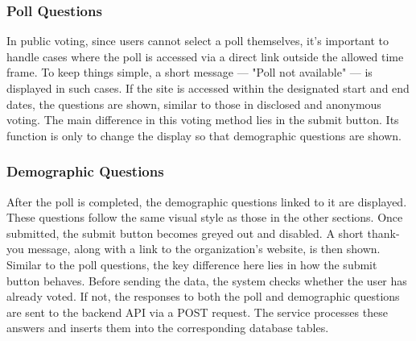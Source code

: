 \documentclass[a4paper,12pt]{report}
\begin{document}
\subsubsection{Poll Questions}
In public voting, since users cannot select a poll themselves, it's important to handle cases where the poll is accessed via a direct link outside the allowed time frame. To keep things simple, a short message — "Poll not available" — is displayed in such cases. If the site is accessed within the designated start and end dates, the questions are shown, similar to those in disclosed and anonymous voting. The main difference in this voting method lies in the submit button. Its function is only to change the display so that demographic questions are shown.

\subsubsection{Demographic Questions}
After the poll is completed, the demographic questions linked to it are displayed. These questions follow the same visual style as those in the other sections. Once submitted, the submit button becomes greyed out and disabled. A short thank-you message, along with a link to the organization's website, is then shown. Similar to the poll questions, the key difference here lies in how the submit button behaves. Before sending the data, the system checks whether the user has already voted. If not, the responses to both the poll and demographic questions are sent to the backend API via a POST request. The service processes these answers and inserts them into the corresponding database tables.
\end{document}
